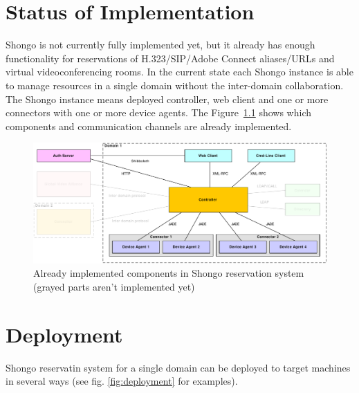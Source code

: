 \chapter{Status of Implementation}

Shongo is not currently fully implemented yet, but it already has enough functionality for reservations of H.323/SIP/Adobe Connect aliases/URLs and virtual videoconferencing rooms. In the current state each Shongo instance is able to manage resources in a single domain without the inter-domain collaboration. The Shongo instance means deployed controller, web client and one or more connectors with one or more device agents. The Figure~\ref{fig:architecture-implemented} shows which components and communication channels are already implemented.

\begin{figure}[ht!]
\includegraphics[width=\textwidth]{diagrams/dd_architecture_implemented}
\caption{Already implemented components in Shongo reservation system (grayed parts aren't implemented yet)}
\label{fig:architecture-implemented}
\end{figure}




\chapter{Deployment}

Shongo reservatin system for a single domain can be deployed to target machines in several ways (see fig. \ref{fig:deployment} for examples).

